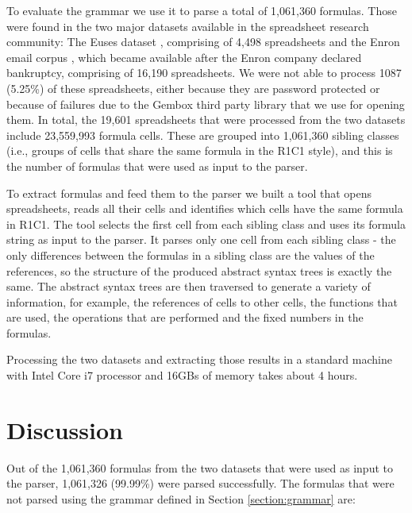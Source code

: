 \documentclass[conference]{IEEEtran}
\begin{document}
To evaluate the grammar we use it to parse a total of 1,061,360 formulas. Those were found in the two major datasets available in the spreadsheet research community: The Euses dataset \cite{euses}, comprising of 4,498 spreadsheets and the Enron email corpus \cite{enron}, which became available after the Enron company declared bankruptcy, comprising of 16,190 spreadsheets. We were not able to process 1087 (5.25\%) of these spreadsheets, either because they are password protected or because of failures due to the Gembox third party library that we use for opening them. In total, the 19,601 spreadsheets that were processed from the two datasets include 23,559,993 formula cells. These are grouped into 1,061,360 sibling classes (i.e., groups of cells that share the same formula in the R1C1 style), and this is the number of formulas that were used as input to the parser.

To extract formulas and feed them to the parser we built a tool that opens spreadsheets, reads all their cells and identifies which cells have the same formula in R1C1. The tool selects the first cell from each sibling class and uses its formula string as input to the parser. It parses only one cell from each sibling class - the only differences between the formulas in a sibling class are the values of the references, so the structure of the produced abstract syntax trees is exactly the same. The abstract syntax trees are then traversed to generate a variety of information, for example, the references of cells to other cells, the functions that are used, the operations that are performed and the fixed numbers in the formulas.

Processing the two datasets and extracting those results in a standard machine with Intel Core i7 processor and 16GBs of memory takes about 4 hours.

\section{Discussion}

Out of the 1,061,360 formulas from the two datasets that were used as input to the parser, 1,061,326 (99.99\%) were parsed successfully. The formulas that were not parsed using the grammar defined in Section \ref{section:grammar} are:
\end{document}
